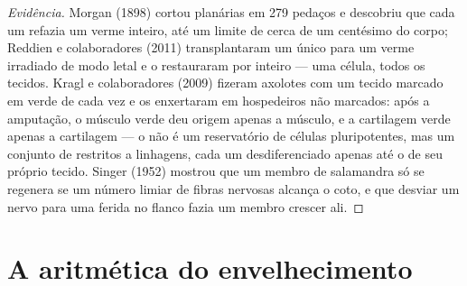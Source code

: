 \begin{proof}[Evidência]
Morgan (1898) cortou planárias em 279 pedaços e descobriu que cada um
refazia um verme inteiro, até um limite de cerca de um centésimo do
corpo; Reddien e colaboradores (2011) transplantaram um único 
para um verme irradiado de modo letal e o restauraram por inteiro --- uma
célula, todos os tecidos. Kragl e colaboradores (2009) fizeram axolotes
com um tecido marcado em verde de cada vez e os enxertaram em hospedeiros
não marcados: após a amputação, o músculo verde deu origem apenas a
músculo, e a cartilagem verde apenas a cartilagem --- o  não é um
reservatório de células pluripotentes, mas um conjunto de 
restritos a linhagens, cada um desdiferenciado apenas até o  de
seu próprio tecido. Singer (1952) mostrou que um membro de salamandra só
se regenera se um número limiar de fibras nervosas alcança o coto, e que
desviar um nervo para uma ferida no flanco fazia um membro crescer ali.
\end{proof}

\section{A aritmética do envelhecimento}

